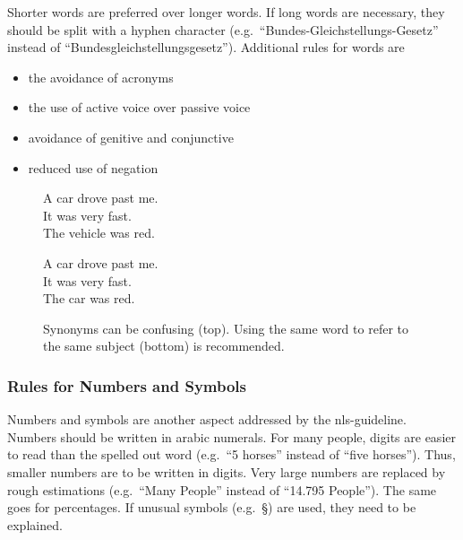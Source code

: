 Shorter words are preferred over longer words.
If long words are necessary, they should be split with a hyphen character (e.g.\ \enquote{Bundes-Gleichstellungs-Gesetz} instead of \enquote{Bundesgleichstellungsgesetz}).
Additional rules for words are
\begin{itemize}[noitemsep]
    \item the avoidance of acronyms
    \item the use of active voice over passive voice
    \item avoidance of genitive and conjunctive
    \item reduced use of negation
\end{itemize}
\begin{figure}[htb]
    \begin{center}
        \colorbox{axablue!20}{
            \begin{minipage}{0.5\textwidth}
                A car drove past me.\\
                It was very fast.\\
                The vehicle was red.
            \end{minipage}
        }
        \colorbox{goodgreen!20}{
            \begin{minipage}{0.5\textwidth}
                A car drove past me.\\
                It was very fast.\\
                The car was red.
            \end{minipage}
        }
    \end{center}
    \caption[Text example for the use of the same word to refer to the same subject.]{Synonyms can be confusing (top). Using the same word to refer to the same subject (bottom) is recommended.}
    \label{fig:subject_ref}
\end{figure}

\subsubsection{Rules for Numbers and Symbols}
Numbers and symbols are another aspect addressed by the \gls{nls}-guideline.
Numbers should be written in arabic numerals.
For many people, digits are easier to read than the spelled out word (e.g.\ \enquote{5 horses} instead of \enquote{five horses}).
Thus, smaller numbers are to be written in digits.
Very large numbers are replaced by rough estimations (e.g.\ \enquote{Many People} instead of \enquote{14.795 People}).
The same goes for percentages.
If unusual symbols (e.g.\ §) are used, they need to be explained.


